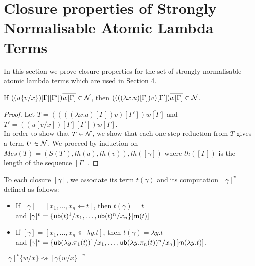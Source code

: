 \documentclass[orivec]{llncs}
\begin{document}



\section{Closure properties of Strongly Normalisable Atomic Lambda Terms}\label{sec:ClosPropSN}


In this section we prove closure properties for the set of strongly normalisable atomic lambda terms
which are used in Section 4.

\begin{ALlemma}\label{lem:IntCaseLambda0}
If $((u\{v/x\})[\Gamma][\Gamma'])\overline{w[\Gamma]} \in \mathcal{N}$, then $((((\lambda x.u)[\Gamma]) v)[\Gamma'])\overline{w[\Gamma]} \in \mathcal{N}$.
\end{ALlemma}

\begin{proof}
 Let $T = ((((\lambda x.u)[\Gamma]) v)[\Gamma'])\overline{w[\Gamma]}$ and $T' = ((u[v/x])[\Gamma][\Gamma'])\overline{w[\Gamma]}$.
\\
In order to show that $T\in\mathcal{N}$, we show that each one-step reduction from $T$ gives a term $U\in\mathcal{N}$.
%
We proceed by induction on $Mes(T) = (S(T'), lh(u), lh(v)), lh([\gamma])$ where
 $lh([\Gamma])$ is the length of the sequence $[\Gamma]$.
\end{proof}

\newcommand{\term}{{\mathsf{t}}}

To each closure $[\gamma]$, we associate its term $t(\gamma)$ and its computation $[\gamma]^v $ defined as follows:
\begin{itemize}
 \item If $[\gamma] = [x_1,\dots,x_n \leftarrow t]$, then $t(\gamma) = t$\\ and $[\gamma]^v = \{{\mathsf{ub}}(t)^1/x_1,\dots,{\mathsf{ub}}(t)^n/x_n\}[{\mathsf{rn}} (t)]$
 \item If $[\gamma] = [x_1,\dots,x_n \twoheadleftarrow \lambda y.t]$, then  $t(\gamma) = \lambda y.t$\\ and $[\gamma]^v = \{{\mathsf{ub}}(\lambda y.\pi_1(t))^1/x_1,\dots,{\mathsf{ub}}(\lambda y.\pi_n(t))^n/x_n\}[{\mathsf{rn}} (\lambda y.t)]$.
\end{itemize}

\begin{ALlemma}\label{lem:CompSubst}
 $[\gamma]^v \{w/x\} \rightsquigarrow [\gamma\{w/x\} ]^v$
\end{ALlemma}
\end{document}

